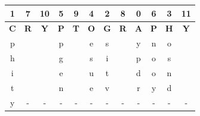 \documentclass{ashoka-crypto}
\begin{document}
\begin{center}
\begin{tabular}{|c|c|c|c|c|c|c|c|c|c|c|c|}
\hline
1          & 7          & 10         & 5          & 9          & 4          & 2          & 8          & 0          & 6          & 3          & 11         \\ \hline
\textbf{C} & \textbf{R} & \textbf{Y} & \textbf{P} & \textbf{T} & \textbf{O} & \textbf{G} & \textbf{R} & \textbf{A} & \textbf{P} & \textbf{H} & \textbf{Y} \\ \hline
p          &            &            & p          &            & e          & s          &            & y          & n          & o          &            \\ \hline
h          &            &            & g          &            & s          & i          &            & p          & o          & s          &            \\ \hline
i          &            &            & e          &            & u          & t          &            & d          & o          & n          &            \\ \hline
t          &            &            & n          &            & e          & v          &            & r          & y          & d          &            \\ \hline
y          &     -       &    -        &      -     &     -       &      -      &     -       &     -       &      -      &     -       &       -     &  -            \\ \hline
\end{tabular}
\end{center}
\end{document}
